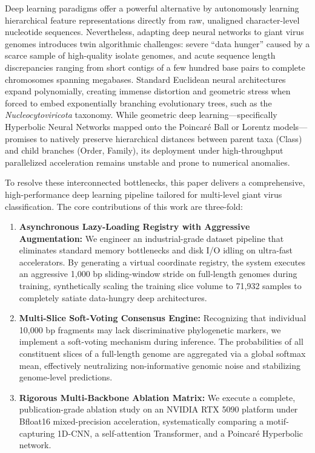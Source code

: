 \documentclass[11pt,a4paper]{article}
\begin{document}
Deep learning paradigms offer a powerful alternative by autonomously learning hierarchical feature representations directly from raw, unaligned character-level nucleotide sequences. Nevertheless, adapting deep neural networks to giant virus genomes introduces twin algorithmic challenges: severe ``data hunger'' caused by a scarce sample of high-quality isolate genomes, and acute sequence length discrepancies ranging from short contigs of a few hundred base pairs to complete chromosomes spanning megabases. Standard Euclidean neural architectures expand polynomially, creating immense distortion and geometric stress when forced to embed exponentially branching evolutionary trees, such as the \textit{Nucleocytoviricota} taxonomy. While geometric deep learning—specifically Hyperbolic Neural Networks mapped onto the Poincaré Ball or Lorentz models—promises to natively preserve hierarchical distances between parent taxa (Class) and child branches (Order, Family), its deployment under high-throughput parallelized acceleration remains unstable and prone to numerical anomalies.

To resolve these interconnected bottlenecks, this paper delivers a comprehensive, high-performance deep learning pipeline tailored for multi-level giant virus classification. The core contributions of this work are three-fold:
\begin{enumerate}
    \item \textbf{Asynchronous Lazy-Loading Registry with Aggressive Augmentation:} We engineer an industrial-grade dataset pipeline that eliminates standard memory bottlenecks and disk I/O idling on ultra-fast accelerators. By generating a virtual coordinate registry, the system executes an aggressive 1,000 bp sliding-window stride on full-length genomes during training, synthetically scaling the training slice volume to 71,932 samples to completely satiate data-hungry deep architectures.
    \item \textbf{Multi-Slice Soft-Voting Consensus Engine:} Recognizing that individual 10,000 bp fragments may lack discriminative phylogenetic markers, we implement a soft-voting mechanism during inference. The probabilities of all constituent slices of a full-length genome are aggregated via a global softmax mean, effectively neutralizing non-informative genomic noise and stabilizing genome-level predictions.
    \item \textbf{Rigorous Multi-Backbone Ablation Matrix:} We execute a complete, publication-grade ablation study on an NVIDIA RTX 5090 platform under Bfloat16 mixed-precision acceleration, systematically comparing a motif-capturing 1D-CNN, a self-attention Transformer, and a Poincaré Hyperbolic network.
\end{enumerate}
\end{document}
